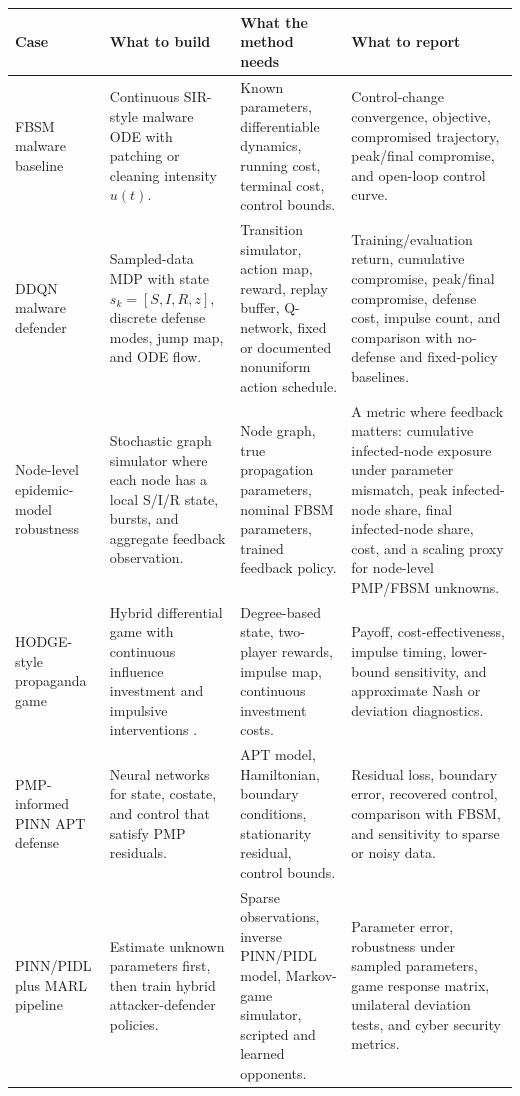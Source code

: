 \documentclass[11pt,a4paper]{article}
\begin{document}
\begin{longtable}{p{}p{}p{}p{}}
\toprule
Case & What to build & What the method needs & What to report \\
\midrule
FBSM malware baseline & Continuous SIR-style malware ODE with patching or cleaning intensity $u(t)$. & Known parameters, differentiable dynamics, running cost, terminal cost, control bounds. & Control-change convergence, objective, compromised trajectory, peak/final compromise, and open-loop control curve. \\
DDQN malware defender & Sampled-data MDP with state $s_k=[S,I,R,z]$, discrete defense modes, jump map, and ODE flow. & Transition simulator, action map, reward, replay buffer, Q-network, fixed or documented nonuniform action schedule. & Training/evaluation return, cumulative compromise, peak/final compromise, defense cost, impulse count, and comparison with no-defense and fixed-policy baselines. \\
Node-level epidemic-model robustness & Stochastic graph simulator where each node has a local S/I/R state, bursts, and aggregate feedback observation. & Node graph, true propagation parameters, nominal FBSM parameters, trained feedback policy. & A metric where feedback matters: cumulative infected-node exposure under parameter mismatch, peak infected-node share, final infected-node share, cost, and a scaling proxy for node-level PMP/FBSM unknowns. \\
HODGE-style propaganda game & Hybrid differential game with continuous influence investment and impulsive interventions \cite{cheng2024propaganda}. & Degree-based state, two-player rewards, impulse map, continuous investment costs. & Payoff, cost-effectiveness, impulse timing, lower-bound sensitivity, and approximate Nash or deviation diagnostics. \\
PMP-informed PINN APT defense & Neural networks for state, costate, and control that satisfy PMP residuals. & APT model, Hamiltonian, boundary conditions, stationarity residual, control bounds. & Residual loss, boundary error, recovered control, comparison with FBSM, and sensitivity to sparse or noisy data. \\
PINN/PIDL plus MARL pipeline & Estimate unknown parameters first, then train hybrid attacker-defender policies. & Sparse observations, inverse PINN/PIDL model, Markov-game simulator, scripted and learned opponents. & Parameter error, robustness under sampled parameters, game response matrix, unilateral deviation tests, and cyber security metrics. \\
\bottomrule
\end{longtable}
\end{document}

